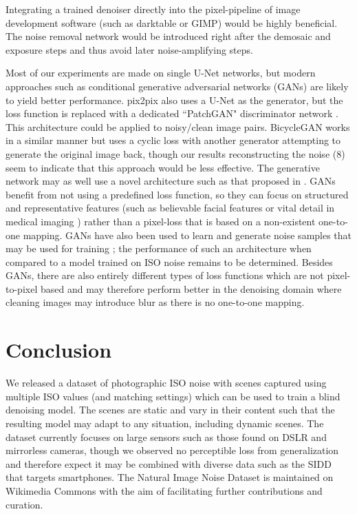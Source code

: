 \documentclass[10pt,twocolumn,letterpaper]{article}
\begin{document}
Integrating a trained denoiser directly into the pixel-pipeline of image development software (such as darktable \cite{darktable} or GIMP) would be highly beneficial. The noise removal network would be introduced right after the demosaic and exposure steps and thus avoid later noise-amplifying steps.

Most of our experiments are made on single U-Net networks, but modern approaches such as conditional generative adversarial networks (GANs) are likely to yield better performance. pix2pix also uses a U-Net as the generator, but the loss function is replaced with a dedicated ``PatchGAN" discriminator network \cite{pix2pix}. This architecture could be applied to noisy/clean image pairs. BicycleGAN \cite{cyclegan} works in a similar manner but uses a cyclic loss with another generator attempting to generate the original image back, though our results reconstructing the noise (8) seem to indicate that this approach would be less effective. The generative network may as well use a novel architecture such as that proposed in \cite{agan}. GANs benefit from not using a predefined loss function, so they can focus on structured and representative features (such as believable facial features or vital detail in medical imaging \cite{ctgan}) rather than a pixel-loss that is based on a non-existent one-to-one mapping. GANs have also been used to learn and generate noise samples that may be used for training \cite{generatenoiseGAN}; the performance of such an architecture when compared to a model trained on ISO noise remains to be determined. Besides GANs, there are also entirely different types of loss functions which are not pixel-to-pixel based \cite{contextualloss} and may therefore perform better in the denoising domain where cleaning images may introduce blur as there is no one-to-one mapping.

\section{Conclusion}

We released a dataset of photographic ISO noise with scenes captured using multiple ISO values (and matching settings) which can be used to train a blind denoising model. The scenes are static and vary in their content such that the resulting model may adapt to any situation, including dynamic scenes. The dataset currently focuses on large sensors such as those found on DSLR and mirrorless cameras, though we observed no perceptible loss from generalization and therefore expect it may be combined with diverse data such as the SIDD \cite{sidd} that targets smartphones. The Natural Image Noise Dataset is maintained on Wikimedia Commons with the aim of facilitating further contributions and curation.





{\small


}
\end{document}
